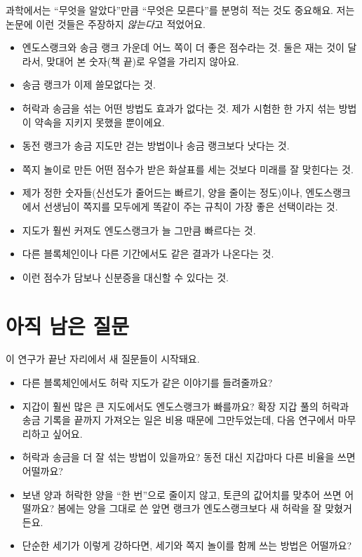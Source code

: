 과학에서는 “무엇을 알았다”만큼 “무엇은 모른다”를 분명히 적는 것도 중요해요.
저는 논문에 이런 것들은 주장하지 \emph{않는다}고 적었어요.

\begin{itemize}
\item 엔도스랭크와 송금 랭크 가운데 어느 쪽이 더 좋은 점수라는 것. 둘은 재는 것이 달라서, 맞대어 본 숫자(책 끝)로 우열을 가리지 않아요.
\item 송금 랭크가 이제 쓸모없다는 것.
\item 허락과 송금을 섞는 어떤 방법도 효과가 없다는 것. 제가 시험한 한 가지 섞는 방법이 약속을 지키지 못했을 뿐이에요.
\item 동전 랭크가 송금 지도만 걷는 방법이나 송금 랭크보다 낫다는 것.
\item 쪽지 놀이로 만든 어떤 점수가 받은 화살표를 세는 것보다 미래를 잘 맞힌다는 것.
\item 제가 정한 숫자들(신선도가 줄어드는 빠르기, 양을 줄이는 정도)이나, 엔도스랭크에서 선생님이 쪽지를 모두에게 똑같이 주는 규칙이 가장 좋은 선택이라는 것.
\item 지도가 훨씬 커져도 엔도스랭크가 늘 그만큼 빠르다는 것.
\item 다른 블록체인이나 다른 기간에서도 같은 결과가 나온다는 것.
\item 이런 점수가 담보나 신분증을 대신할 수 있다는 것.
\end{itemize}

\section{아직 남은 질문}

이 연구가 끝난 자리에서 새 질문들이 시작돼요.

\begin{itemize}
\item 다른 블록체인에서도 허락 지도가 같은 이야기를 들려줄까요?
\item 지갑이 훨씬 많은 큰 지도에서도 엔도스랭크가 빠를까요? 확장 지갑 풀의 허락과 송금 기록을 끝까지 가져오는 일은 비용 때문에 그만두었는데, 다음 연구에서 마무리하고 싶어요.
\item 허락과 송금을 더 잘 섞는 방법이 있을까요? 동전 대신 지갑마다 다른 비율을 쓰면 어떨까요?
\item 보낸 양과 허락한 양을 “한 번”으로 줄이지 않고, 토큰의 값어치를 맞추어 쓰면 어떨까요? 봄에는 양을 그대로 쓴 앞면 랭크가 엔도스랭크보다 새 허락을 잘 맞혔거든요.
\item 단순한 세기가 이렇게 강하다면, 세기와 쪽지 놀이를 함께 쓰는 방법은 어떨까요?
\end{itemize}

